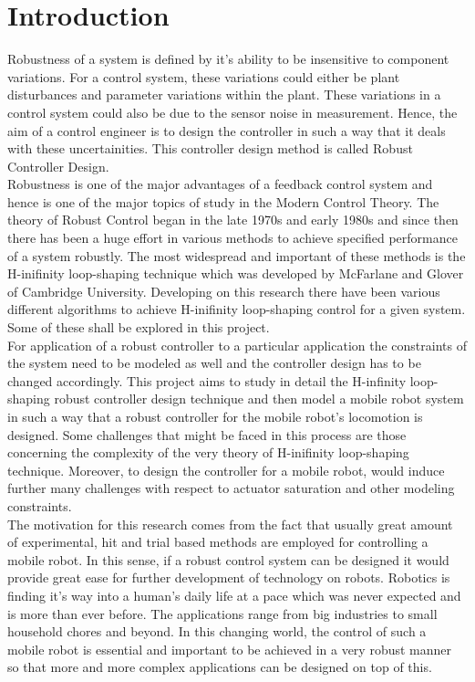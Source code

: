 \documentclass[a4paper,12pt]{article}
\begin{document}
\section{Introduction}
Robustness of a system is defined by it's ability to be insensitive to component variations. For a control system, these variations could either be plant disturbances and parameter variations within the plant. These variations in a control system could also be due to the sensor noise in measurement. Hence, the aim of a control engineer is to design the controller in such a way that it deals with these uncertainities. This controller design method is called Robust Controller Design. \\
Robustness is one of the major advantages of a feedback control system and hence is one of the major topics of study in the Modern Control Theory. The theory of Robust Control began in the late 1970s and early 1980s and since then there has been a huge effort in various methods to achieve specified performance of a system robustly. The most widespread and important of these methods is the H-inifinity loop-shaping technique which was developed by McFarlane and Glover of Cambridge University. Developing on this research there have been various different algorithms to achieve H-inifinity loop-shaping control for a given system. Some of these shall be explored in this project. \\
For application of a robust controller to a particular application the constraints of the system need to be modeled as well and the controller design has to be changed accordingly. This project aims to study in detail the H-infinity loop-shaping robust controller design technique and then model a mobile robot system in such a way that a robust controller for the mobile robot's locomotion is designed. Some challenges that might be faced in this process are those concerning the complexity of the very theory of  H-inifinity loop-shaping technique. Moreover, to design the controller for a mobile robot, would induce further many challenges with respect to actuator saturation and other modeling constraints.\\
The motivation for this research comes from the fact that usually great amount of experimental, hit and trial based methods are employed for controlling a mobile robot. In this sense, if a robust control system can be designed it would provide great ease for further development of technology on robots. Robotics is finding it's way into a human's daily life at a pace which was never expected and is more than ever before. The applications range from big industries to small household chores and beyond. In this changing world, the control of such a mobile robot is essential and important to be achieved in a very robust manner so that more and more complex applications can be designed on top of this.
\end{document}
